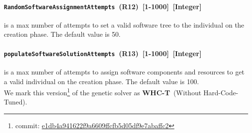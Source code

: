 \paragraph{\texttt{RandomSoftwareAssignmentAttempts}~(R12)~[1-1000]~[Integer]} is a max number of attempts to set a valid software tree to the individual on the creation phase. The default value is 50.
\paragraph{\texttt{populateSoftwareSolutionAttempts}~(R13)~[1-1000]~[Integer]} is a max number of attempts to assign software components and resources to get a valid individual on the creation phase. The default value is 100.\\

We mark this version\footnote{commit: \href{https://git-st.inf.tu-dresden.de/mquat/mquat2/commit/e1db4a941622f9a6609ffcfb5d05df9e7abaffc2}{e1db4a941622f9a6609ffcfb5d05df9e7abaffc2}} of the genetic solver as \textbf{WHC-T}~(Without Hard-Code-Tuned).


\begin{table}
	\centering
	\caption{Optimized parameters of WHC-T version of the genetic solver}\label{tab:Parameters_NHC-T}
\end{table}

